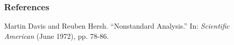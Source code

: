 \begin{frame}
\frametitle{References}
\label{slide:references}
\begin{thebibliography}{10}
Martin Davis and Reuben Hersh. ``Nonstandard Analysis.'' In: \emph{Scientific American} (June 1972), pp. 78-86.
\end{thebibliography}
\end{frame}
